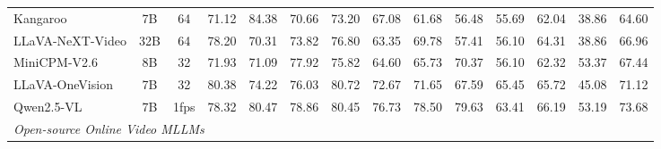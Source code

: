 \begin{table}[ht]
{\begin{tabular}{lccccccccccccc}
Kangaroo   \cite{liu2024kangaroo}                 & 7B            & \multicolumn{1}{c|}{64}                & 71.12                        & 84.38                        & 70.66                        & 73.20                        & 67.08                        & 61.68                        & 56.48                        & 55.69                        & 62.04                        & \multicolumn{1}{c|}{38.86}                        & 64.60                        \\
LLaVA-NeXT-Video    \cite{zhang2024llavavideo}        & 32B           & \multicolumn{1}{c|}{64}                & 78.20                        & 70.31                        & 73.82                        & 76.80                        & 63.35                        & 69.78                        & 57.41                        & 56.10                        & 64.31                        & \multicolumn{1}{c|}{38.86}                        & 66.96                        \\
MiniCPM-V2.6   \cite{yao2024minicpmv}             & 8B            & \multicolumn{1}{c|}{32}                & 71.93                        & 71.09                        & 77.92                        & 75.82                        & 64.60                        & 65.73                        & 70.37                        & 56.10                        & 62.32                        & \multicolumn{1}{c|}{53.37}                        & 67.44                        \\
LLaVA-OneVision   \cite{li2024llavaov}          & 7B            & \multicolumn{1}{c|}{32}                & 80.38                        & 74.22                        & 76.03                        & 80.72                        & 72.67                        & 71.65                        & 67.59                        & 65.45                        & 65.72                        & \multicolumn{1}{c|}{45.08}                        & 71.12                        \\
Qwen2.5-VL   \cite{bai2025qwen2_5vl}               & 7B            & \multicolumn{1}{c|}{1fps}              & 78.32                        & 80.47                        & 78.86                        & 80.45                        & 76.73                        & 78.50                        & 79.63                        & 63.41                        & 66.19                        & \multicolumn{1}{c|}{53.19}                        & 73.68                        \\ \midrule
\multicolumn{14}{l}{\textit{Open-source Online Video MLLMs}}                                                                                                                                                                                                                                                                                                                                                                                                   \\ \midrule

\end{tabular}}
\end{table}
